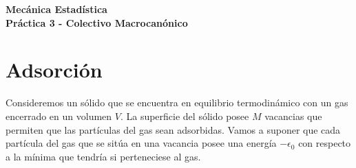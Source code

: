 \documentclass[a4paper,11pt]{article}
\begin{document}
\pagestyle{fancy}
\chead{\small \the\year}



\thispagestyle{plain}
\begin{center}
    \textbf{\large
        Mecánica Estadística \\
        Práctica 3 - Colectivo Macrocanónico
    }
\end{center}
\vspace{-1.5em}




\section{Adsorción}

Consideremos un sólido que se encuentra en equilibrio termodinámico con un 
gas encerrado en un volumen $V$.
La superficie del sólido posee $M$ vacancias que permiten que las partículas 
del gas sean adsorbidas. Vamos a suponer que cada partícula del gas que se 
sitúa en una vacancia posee una energía $-\epsilon_0$ con respecto a la mínima 
que tendría si perteneciese al gas.
\end{document}
